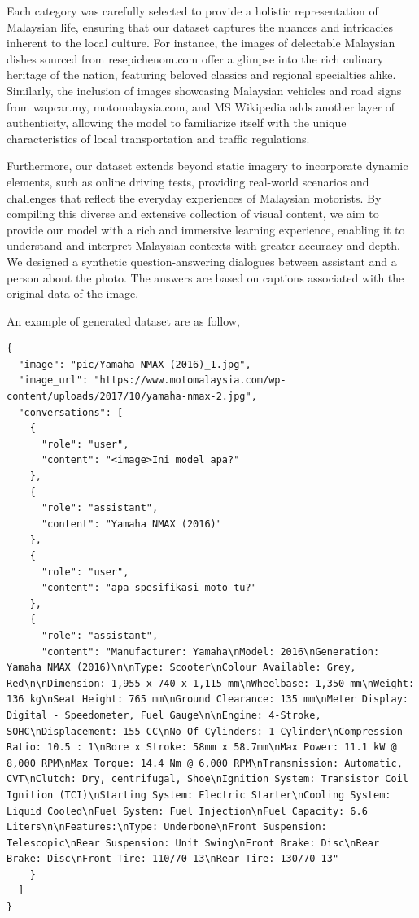 \documentclass[preprint]{article}
\begin{document}
Each category was carefully selected to provide a holistic representation of Malaysian life, ensuring that our dataset captures the nuances and intricacies inherent to the local culture. For instance, the images of delectable Malaysian dishes sourced from resepichenom.com offer a glimpse into the rich culinary heritage of the nation, featuring beloved classics and regional specialties alike. Similarly, the inclusion of images showcasing Malaysian vehicles and road signs from wapcar.my, motomalaysia.com, and MS Wikipedia adds another layer of authenticity, allowing the model to familiarize itself with the unique characteristics of local transportation and traffic regulations.

Furthermore, our dataset extends beyond static imagery to incorporate dynamic elements, such as online driving tests, providing real-world scenarios and challenges that reflect the everyday experiences of Malaysian motorists. By compiling this diverse and extensive collection of visual content, we aim to provide our model with a rich and immersive learning experience, enabling it to understand and interpret Malaysian contexts with greater accuracy and depth. We designed a synthetic question-answering dialogues between assistant and a person about the photo. The answers are based on captions associated with the original data of the image.

An example of generated dataset are as follow,

\begin{lstlisting}[breaklines=true]
{
  "image": "pic/Yamaha NMAX (2016)_1.jpg",
  "image_url": "https://www.motomalaysia.com/wp-content/uploads/2017/10/yamaha-nmax-2.jpg",
  "conversations": [
    {
      "role": "user",
      "content": "<image>Ini model apa?"
    },
    {
      "role": "assistant",
      "content": "Yamaha NMAX (2016)"
    },
    {
      "role": "user",
      "content": "apa spesifikasi moto tu?"
    },
    {
      "role": "assistant",
      "content": "Manufacturer: Yamaha\nModel: 2016\nGeneration: Yamaha NMAX (2016)\n\nType: Scooter\nColour Available: Grey, Red\n\nDimension: 1,955 x 740 x 1,115 mm\nWheelbase: 1,350 mm\nWeight: 136 kg\nSeat Height: 765 mm\nGround Clearance: 135 mm\nMeter Display: Digital - Speedometer, Fuel Gauge\n\nEngine: 4-Stroke, SOHC\nDisplacement: 155 CC\nNo Of Cylinders: 1-Cylinder\nCompression Ratio: 10.5 : 1\nBore x Stroke: 58mm x 58.7mm\nMax Power: 11.1 kW @ 8,000 RPM\nMax Torque: 14.4 Nm @ 6,000 RPM\nTransmission: Automatic, CVT\nClutch: Dry, centrifugal, Shoe\nIgnition System: Transistor Coil Ignition (TCI)\nStarting System: Electric Starter\nCooling System: Liquid Cooled\nFuel System: Fuel Injection\nFuel Capacity: 6.6 Liters\n\nFeatures:\nType: Underbone\nFront Suspension: Telescopic\nRear Suspension: Unit Swing\nFront Brake: Disc\nRear Brake: Disc\nFront Tire: 110/70-13\nRear Tire: 130/70-13"
    }
  ]
}
\end{lstlisting}
\end{document}
